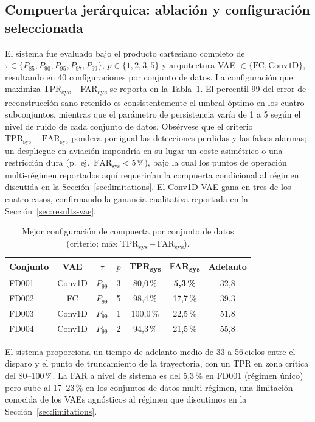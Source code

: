 \documentclass[5p,times,authoryear]{elsarticle}
\begin{document}
\subsection{Compuerta jerárquica: ablación y configuración seleccionada}\label{sec:results-ablation}

El sistema fue evaluado bajo el producto cartesiano completo de $\tau\in\{P_{85},P_{90},P_{95},P_{97},P_{99}\}$, $p\in\{1,2,3,5\}$ y arquitectura VAE $\in\{\text{FC},\text{Conv1D}\}$, resultando en 40 configuraciones por conjunto de datos. La configuración que maximiza TPR\textsubscript{sys}\,$-$\,FAR\textsubscript{sys} se reporta en la Tabla~\ref{tab:gating-best}. El percentil 99 del error de reconstrucción sano retenido es consistentemente el umbral óptimo en los cuatro subconjuntos, mientras que el parámetro de persistencia varía de 1 a 5 según el nivel de ruido de cada conjunto de datos. Obsérvese que el criterio $\mathrm{TPR}_{\mathrm{sys}}-\mathrm{FAR}_{\mathrm{sys}}$ pondera por igual las detecciones perdidas y las falsas alarmas; un despliegue en aviación impondría en su lugar un coste asimétrico o una restricción dura (p.~ej.\ $\mathrm{FAR}_{\mathrm{sys}}<5\,\%$), bajo la cual los puntos de operación multi-régimen reportados aquí requerirían la compuerta condicional al régimen discutida en la Sección~\ref{sec:limitations}. El Conv1D-VAE gana en tres de los cuatro casos, confirmando la ganancia cualitativa reportada en la Sección~\ref{sec:results-vae}.

\begin{table}[!t]
\centering
\caption{Mejor configuración de compuerta por conjunto de datos (criterio: máx TPR\textsubscript{sys}\,$-$\,FAR\textsubscript{sys}).}
\label{tab:gating-best}
\small
\begin{tabular}{lcccccc}
\toprule
Conjunto & VAE & $\tau$ & $p$ & TPR\textsubscript{sys} & FAR\textsubscript{sys} & Adelanto \\
\midrule
FD001 & Conv1D & $P_{99}$ & 3 & 80,0\,\%  & \textbf{5,3\,\%}  & 32,8 \\
FD002 & FC     & $P_{99}$ & 5 & 98,4\,\%  & 17,7\,\%          & 39,3 \\
FD003 & Conv1D & $P_{99}$ & 1 & 100,0\,\% & 22,5\,\%          & 51,8 \\
FD004 & Conv1D & $P_{99}$ & 2 & 94,3\,\%  & 21,5\,\%          & 55,8 \\
\bottomrule
\end{tabular}
\end{table}

El sistema proporciona un tiempo de adelanto medio de 33 a 56\,ciclos entre el disparo y el punto de truncamiento de la trayectoria, con un TPR en zona crítica del 80--100\,\%. La FAR a nivel de sistema es del 5{,}3\,\% en FD001 (régimen único) pero sube al 17--23\,\% en los conjuntos de datos multi-régimen, una limitación conocida de los VAEs agnósticos al régimen que discutimos en la Sección~\ref{sec:limitations}.
\end{document}
